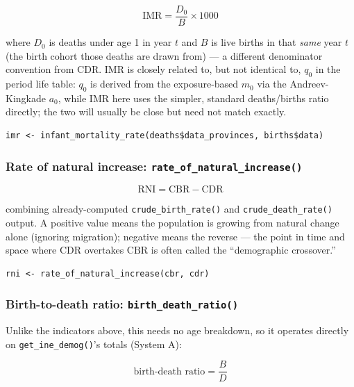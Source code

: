 \documentclass[11pt]{article}
\newcommand{\fn}[1]{\texttt{#1}}
\begin{document}
\begin{equation}
\mathrm{IMR} = \frac{D_{0}}{B}\times 1000
\end{equation}

where $D_0$ is deaths under age 1 in year $t$ and $B$ is live births in that
\emph{same} year $t$ (the birth cohort those deaths are drawn from) --- a
different denominator convention from CDR. IMR is closely related to, but
not identical to, $q_0$ in the period life table: $q_0$ is derived from the
exposure-based $m_0$ via the Andreev-Kingkade $a_0$, while IMR here uses the
simpler, standard deaths/births ratio directly; the two will usually be
close but need not match exactly.

\begin{lstlisting}
imr <- infant_mortality_rate(deaths$data_provinces, births$data)
\end{lstlisting}

\subsubsection{Rate of natural increase: \fn{rate\_of\_natural\_increase()}}

\begin{equation}
\mathrm{RNI} = \mathrm{CBR} - \mathrm{CDR}
\end{equation}

combining already-computed \fn{crude\_birth\_rate()} and
\fn{crude\_death\_rate()} output. A positive value means the population is
growing from natural change alone (ignoring migration); negative means the
reverse --- the point in time and space where $\mathrm{CDR}$ overtakes
$\mathrm{CBR}$ is often called the ``demographic crossover.''

\begin{lstlisting}
rni <- rate_of_natural_increase(cbr, cdr)
\end{lstlisting}

\subsubsection{Birth-to-death ratio: \fn{birth\_death\_ratio()}}

Unlike the indicators above, this needs no age breakdown, so it operates
directly on \fn{get\_ine\_demog()}'s totals (System A):

\begin{equation}
\text{birth-death ratio} = \frac{B}{D}
\end{equation}
\end{document}
